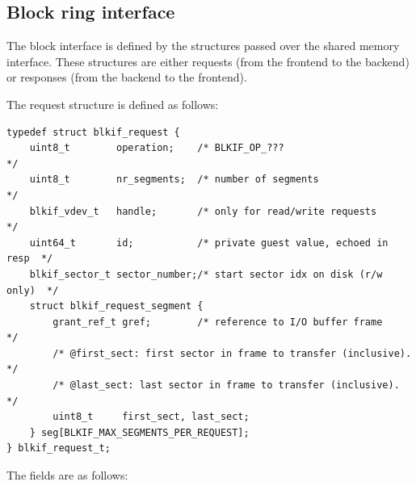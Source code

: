 \documentclass[11pt,twoside,final,openright]{report}
\begin{document}

\subsection{Block ring interface}

The block interface is defined by the structures passed over the
shared memory interface.  These structures are either requests (from
the frontend to the backend) or responses (from the backend to the
frontend).

The request structure is defined as follows:

\scriptsize
\begin{verbatim}
typedef struct blkif_request {
    uint8_t        operation;    /* BLKIF_OP_???                         */
    uint8_t        nr_segments;  /* number of segments                   */
    blkif_vdev_t   handle;       /* only for read/write requests         */
    uint64_t       id;           /* private guest value, echoed in resp  */
    blkif_sector_t sector_number;/* start sector idx on disk (r/w only)  */
    struct blkif_request_segment {
        grant_ref_t gref;        /* reference to I/O buffer frame        */
        /* @first_sect: first sector in frame to transfer (inclusive).   */
        /* @last_sect: last sector in frame to transfer (inclusive).     */
        uint8_t     first_sect, last_sect;
    } seg[BLKIF_MAX_SEGMENTS_PER_REQUEST];
} blkif_request_t;
\end{verbatim}
\normalsize

The fields are as follows:
\end{document}
